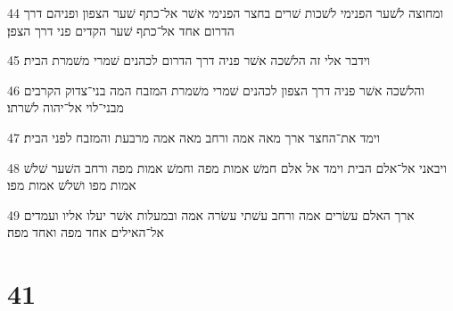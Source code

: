 \par 44 ומחוצה לשׁער הפנימי לשׁכות שׁרים בחצר הפנימי אשׁר אל־כתף שׁער הצפון ופניהם דרך הדרום אחד אל־כתף שׁער הקדים פני דרך הצפן׃
\par 45 וידבר אלי זה הלשׁכה אשׁר פניה דרך הדרום לכהנים שׁמרי משׁמרת הבית׃
\par 46 והלשׁכה אשׁר פניה דרך הצפון לכהנים שׁמרי משׁמרת המזבח המה בני־צדוק הקרבים מבני־לוי אל־יהוה לשׁרתו׃
\par 47 וימד את־החצר ארך מאה אמה ורחב מאה אמה מרבעת והמזבח לפני הבית׃
\par 48 ויבאני אל־אלם הבית וימד אל אלם חמשׁ אמות מפה וחמשׁ אמות מפה ורחב השׁער שׁלשׁ אמות מפו ושׁלשׁ אמות מפו׃
\par 49 ארך האלם עשׂרים אמה ורחב עשׁתי עשׂרה אמה ובמעלות אשׁר יעלו אליו ועמדים אל־האילים אחד מפה ואחד מפה׃

\chapter{41}

